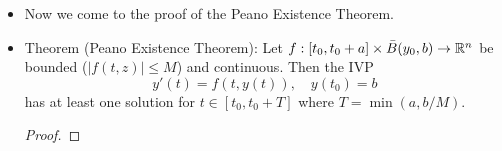 \documentclass[../notes.tex]{subfiles}
\begin{document}
\begin{itemize}
\begin{proof}
        Lastly, we can prove that the limit function $f$ of $\{f_\ell\}$ is $L$-Lipschitz as follows. Let $t,t'\in[a,b]$ be arbitrary. Then
        \begin{equation*}
            \left| \frac{f(t)-f(t')}{t-t'} \right| = \lim_{k\to\infty}\left| \frac{f_k(t)-f_k(t')}{t-t'} \right|
            \leq \lim_{k\to\infty}\left| \frac{L|t-t'|}{t-t'} \right|
            = \lim_{k\to\infty}|L|
            = L
        \end{equation*}
        as desired.
    \end{proof}
    \item Now we come to the proof of the Peano Existence Theorem.
    \item Theorem (Peano Existence Theorem): Let $f:[t_0,t_0+a]\times\bar{B}(y_0,b)\to\mathbb{R}^n$ be bounded ($|f(t,z)|\leq M$) and continuous. Then the IVP
    \begin{equation*}
        y'(t)=f(t,y(t))
        ,\quad
        y(t_0)=b
    \end{equation*}
    has at least one solution for $t\in[t_0,t_0+T]$ where $T=\min(a,b/M)$.
    \begin{proof}



\end{proof}
\end{itemize}
\end{document}
